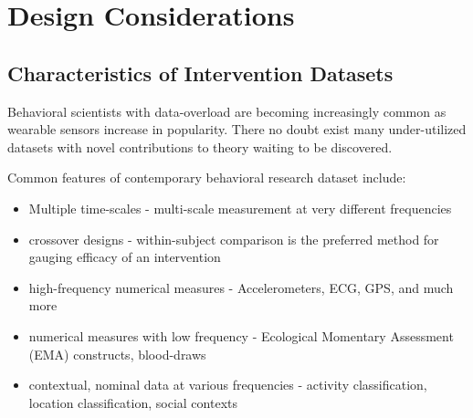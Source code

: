 \section{Design Considerations}

\subsection{Characteristics of Intervention Datasets}

Behavioral scientists with data-overload are becoming increasingly common as wearable sensors increase in popularity.
There no doubt exist many under-utilized datasets with novel contributions to theory waiting to be discovered.

Common features of contemporary behavioral research dataset include:

\begin{itemize}
	\item{Multiple time-scales - multi-scale measurement at very different frequencies}
	\item{crossover designs - within-subject comparison is the preferred method for gauging efficacy of an intervention}
	\item{high-frequency numerical measures - Accelerometers, ECG, GPS, and much more}
	\item{numerical measures with low frequency - Ecological Momentary Assessment (EMA) constructs, blood-draws}
	\item{contextual, nominal data at various frequencies - activity classification, location classification, social contexts}
\end{itemize}


